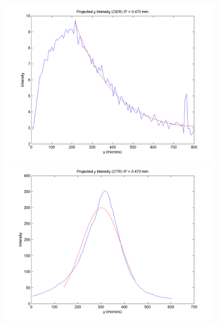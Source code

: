 \documentclass[12pt]{article}
\begin{document}
\begin{figure}
\begin{center}
\includegraphics[scale=0.5]{Figures/ProjY_ODR_470.PNG}
\includegraphics[scale=0.5]{Figures/ProjY_OTR_470.PNG}
\caption{}
\end{center}
\end{figure}
\end{document}
